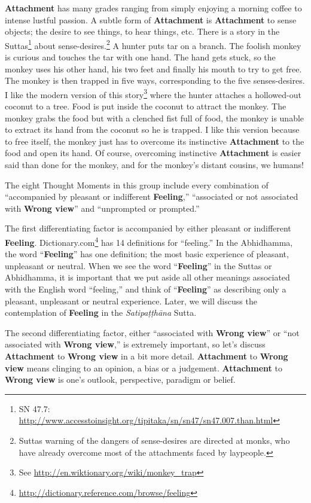 \textbf{Attachment} has many grades ranging from simply enjoying a morning coffee to intense lustful passion. A subtle form of \textbf{Attachment} is \textbf{Attachment} to sense objects; the desire to see things, to hear things, etc. There is a story in the Suttas\footnote{SN 47.7: \url{http://www.accesstoinsight.org/tipitaka/sn/sn47/sn47.007.than.html}} about sense-desires.\footnote{Suttas warning of the dangers of sense-desires are directed at monks, who have already overcome most of the attachments faced by laypeople.} A hunter puts tar on a branch. The foolish monkey is curious and touches the tar with one hand. The hand gets stuck, so the monkey uses his other hand, his two feet and finally his mouth to try to get free. The monkey is then trapped in five ways, corresponding to the five senses-desires. I like the modern version of this story\footnote{See \url{http://en.wiktionary.org/wiki/monkey_trap}} where the hunter attaches a hollowed-out coconut to a tree. Food is put inside the coconut to attract the monkey. The monkey grabs the food but with a clenched fist full of food, the monkey is unable to extract its hand from the coconut so he is trapped. I like this version because to free itself, the monkey just has to overcome its instinctive \textbf{Attachment} to the food and open its hand. Of course, overcoming instinctive \textbf{Attachment} is easier said than done for the monkey, and for the monkey’s distant cousins, we humans!

The eight Thought Moments in this group include every combination of “accompanied by pleasant or indifferent \textbf{Feeling},” “associated or not associated with \textbf{Wrong view}” and “unprompted or prompted.”

The first differentiating factor is accompanied by either pleasant or indifferent \textbf{Feeling}. Dictionary.com\footnote{\url{http://dictionary.reference.com/browse/feeling}} has 14 definitions for “feeling.” In the Abhidhamma, the word “\textbf{Feeling}” has one definition; the most basic experience of pleasant, unpleasant or neutral. When we see the word “\textbf{Feeling}” in the Suttas or Abhidhamma, it is important that we put aside all other meanings associated with the English word “feeling,” and think of “\textbf{Feeling}” as describing only a pleasant, unpleasant or neutral experience. Later, we will discuss the contemplation of \textbf{Feeling} in the \textit{Satipaṭṭhāna} Sutta.

The second differentiating factor, either “associated with \textbf{Wrong view}” or “not associated with \textbf{Wrong view},” is extremely important, so let’s discuss \textbf{Attachment} to \textbf{Wrong view} in a bit more detail. \textbf{Attachment} to \textbf{Wrong view} means clinging to an opinion, a bias or a judgement. \textbf{Attachment} to \textbf{Wrong view} is one’s outlook, perspective, paradigm or belief.

